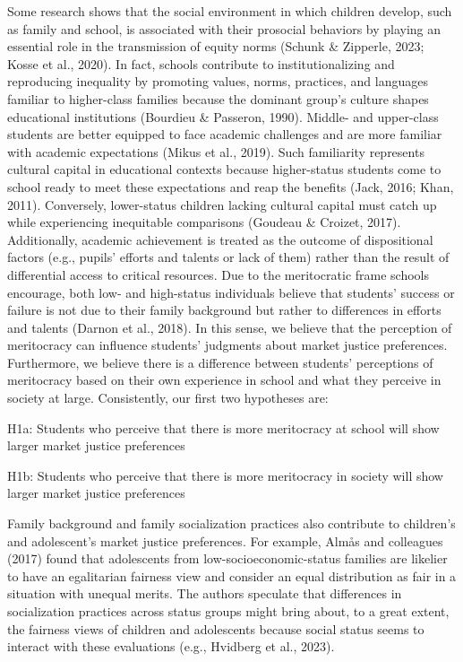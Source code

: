 \documentclass[
  letterpaper,
  DIV=11,
  numbers=noendperiod]{scrartcl}
\begin{document}
Some research shows that the social environment in which children
develop, such as family and school, is associated with their prosocial
behaviors by playing an essential role in the transmission of equity
norms (Schunk \& Zipperle, 2023; Kosse et al., 2020). In fact, schools
contribute to institutionalizing and reproducing inequality by promoting
values, norms, practices, and languages familiar to higher-class
families because the dominant group's culture shapes educational
institutions (Bourdieu \& Passeron, 1990). Middle- and upper-class
students are better equipped to face academic challenges and are more
familiar with academic expectations (Mikus et al., 2019). Such
familiarity represents cultural capital in educational contexts because
higher-status students come to school ready to meet these expectations
and reap the benefits (Jack, 2016; Khan, 2011). Conversely, lower-status
children lacking cultural capital must catch up while experiencing
inequitable comparisons (Goudeau \& Croizet, 2017). Additionally,
academic achievement is treated as the outcome of dispositional factors
(e.g., pupils' efforts and talents or lack of them) rather than the
result of differential access to critical resources. Due to the
meritocratic frame schools encourage, both low- and high-status
individuals believe that students' success or failure is not due to
their family background but rather to differences in efforts and talents
(Darnon et al., 2018). In this sense, we believe that the perception of
meritocracy can influence students' judgments about market justice
preferences. Furthermore, we believe there is a difference between
students' perceptions of meritocracy based on their own experience in
school and what they perceive in society at large. Consistently, our
first two hypotheses are:

H1a: Students who perceive that there is more meritocracy at school will
show larger market justice preferences

H1b: Students who perceive that there is more meritocracy in society
will show larger market justice preferences

Family background and family socialization practices also contribute to
children's and adolescent's market justice preferences. For example,
Almås and colleagues (2017) found that adolescents from
low-socioeconomic-status families are likelier to have an egalitarian
fairness view and consider an equal distribution as fair in a situation
with unequal merits. The authors speculate that differences in
socialization practices across status groups might bring about, to a
great extent, the fairness views of children and adolescents because
social status seems to interact with these evaluations (e.g., Hvidberg
et al., 2023).~
\end{document}
